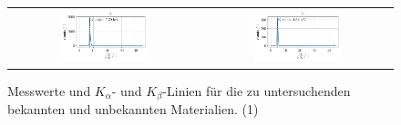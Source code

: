\documentclass[ngerman]{scrartcl}
\begin{document}
\begin{figure}[H]
\begin{tabular}{cc}
        \includegraphics[width=0.48\textwidth]{../plots/roentgen_data_5.pdf} &
        \includegraphics[width=0.48\textwidth]{../plots/roentgen_data_6.pdf}   \\
    \end{tabular}
    \caption{Messwerte und $K_{\alpha}$- und $K_{\beta}$-Linien für die zu untersuchenden bekannten und unbekannten Materialien. (1)}
    \label{fig:roentgenfloureszenz1}
\end{figure}
\end{document}
